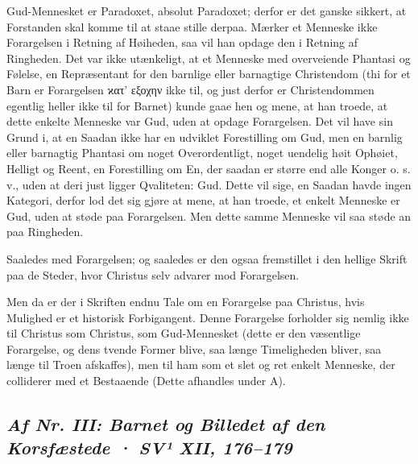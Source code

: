 \documentclass[12pt,a4paper]{article}
\newcommand{\sectionheading}[1]{\subsection*{\normalfont\itshape #1}}
\begin{document}
Gud-Mennesket er Paradoxet, absolut Paradoxet; derfor er det ganske sikkert, at Forstanden skal komme til at staae stille derpaa. Mærker et Menneske ikke Forargelsen i Retning af Høiheden, saa vil han opdage den i Retning af Ringheden. Det var ikke utænkeligt, at et Menneske med overveiende Phantasi og Følelse, en Repræsentant for den barnlige eller barnagtige Christendom (thi for et Barn er Forargelsen ϰατ' εξοχην ikke til, og just derfor er Christendommen egentlig heller ikke til for Barnet) kunde gaae hen og mene, at han troede, at dette enkelte Menneske var Gud, uden at opdage Forargelsen. Det vil have sin Grund i, at en Saadan ikke har en udviklet Forestilling om Gud, men en barnlig eller barnagtig Phantasi om noget Overordentligt, noget uendelig høit Ophøiet, Helligt og Reent, en Forestilling om En, der saadan er større end alle Konger o. s. v., uden at deri just ligger Qvaliteten: Gud. Dette vil sige, en Saadan havde ingen Kategori, derfor lod det sig gjøre at mene, at han troede, et enkelt Menneske er Gud, uden at støde paa Forargelsen. Men dette samme Menneske vil saa støde an paa Ringheden.

Saaledes med Forargelsen; og saaledes er den ogsaa fremstillet i den hellige Skrift paa de Steder, hvor Christus selv advarer mod Forargelsen.

Men da er der i Skriften endnu Tale om en Forargelse paa Christus, hvis Mulighed er et historisk Forbigangent. Denne Forargelse forholder sig nemlig ikke til Christus som Christus, som Gud-Mennesket (dette er den væsentlige Forargelse, og dens tvende Former blive, saa længe Timeligheden bliver, saa længe til Troen afskaffes), men til ham som et slet og ret enkelt Menneske, der colliderer med et Bestaaende (Dette afhandles under A).

\sectionheading{Af Nr. III: Barnet og Billedet af den Korsfæstede  ·  SV¹ XII, 176–179}
\end{document}
